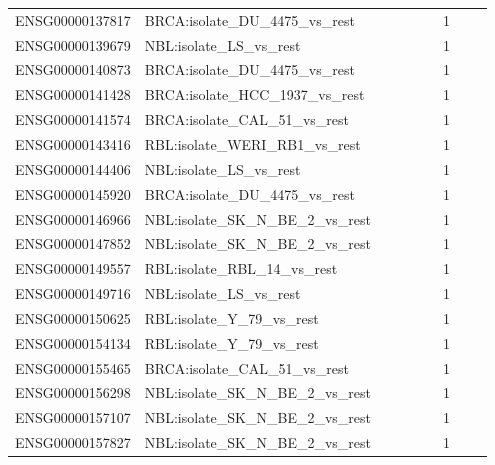 \begin{landscape}
{\begin{longtable}{p{0.18\linewidth}p{0.65\linewidth}p{0.12\linewidth}}
ENSG00000137817 & BRCA:isolate\_\allowbreak{}DU\_\allowbreak{}4475\_\allowbreak{}vs\_\allowbreak{}rest & 1 \\
ENSG00000139679 & NBL:isolate\_\allowbreak{}LS\_\allowbreak{}vs\_\allowbreak{}rest & 1 \\
ENSG00000140873 & BRCA:isolate\_\allowbreak{}DU\_\allowbreak{}4475\_\allowbreak{}vs\_\allowbreak{}rest & 1 \\
ENSG00000141428 & BRCA:isolate\_\allowbreak{}HCC\_\allowbreak{}1937\_\allowbreak{}vs\_\allowbreak{}rest & 1 \\
ENSG00000141574 & BRCA:isolate\_\allowbreak{}CAL\_\allowbreak{}51\_\allowbreak{}vs\_\allowbreak{}rest & 1 \\
ENSG00000143416 & RBL:isolate\_\allowbreak{}WERI\_\allowbreak{}RB1\_\allowbreak{}vs\_\allowbreak{}rest & 1 \\
ENSG00000144406 & NBL:isolate\_\allowbreak{}LS\_\allowbreak{}vs\_\allowbreak{}rest & 1 \\
ENSG00000145920 & BRCA:isolate\_\allowbreak{}DU\_\allowbreak{}4475\_\allowbreak{}vs\_\allowbreak{}rest & 1 \\
ENSG00000146966 & NBL:isolate\_\allowbreak{}SK\_\allowbreak{}N\_\allowbreak{}BE\_\allowbreak{}2\_\allowbreak{}vs\_\allowbreak{}rest & 1 \\
ENSG00000147852 & NBL:isolate\_\allowbreak{}SK\_\allowbreak{}N\_\allowbreak{}BE\_\allowbreak{}2\_\allowbreak{}vs\_\allowbreak{}rest & 1 \\
ENSG00000149557 & RBL:isolate\_\allowbreak{}RBL\_\allowbreak{}14\_\allowbreak{}vs\_\allowbreak{}rest & 1 \\
ENSG00000149716 & NBL:isolate\_\allowbreak{}LS\_\allowbreak{}vs\_\allowbreak{}rest & 1 \\
ENSG00000150625 & RBL:isolate\_\allowbreak{}Y\_\allowbreak{}79\_\allowbreak{}vs\_\allowbreak{}rest & 1 \\
ENSG00000154134 & RBL:isolate\_\allowbreak{}Y\_\allowbreak{}79\_\allowbreak{}vs\_\allowbreak{}rest & 1 \\
ENSG00000155465 & BRCA:isolate\_\allowbreak{}CAL\_\allowbreak{}51\_\allowbreak{}vs\_\allowbreak{}rest & 1 \\
ENSG00000156298 & NBL:isolate\_\allowbreak{}SK\_\allowbreak{}N\_\allowbreak{}BE\_\allowbreak{}2\_\allowbreak{}vs\_\allowbreak{}rest & 1 \\
ENSG00000157107 & NBL:isolate\_\allowbreak{}SK\_\allowbreak{}N\_\allowbreak{}BE\_\allowbreak{}2\_\allowbreak{}vs\_\allowbreak{}rest & 1 \\
ENSG00000157827 & NBL:isolate\_\allowbreak{}SK\_\allowbreak{}N\_\allowbreak{}BE\_\allowbreak{}2\_\allowbreak{}vs\_\allowbreak{}rest & 1 \\

\end{longtable}}
\end{landscape}
